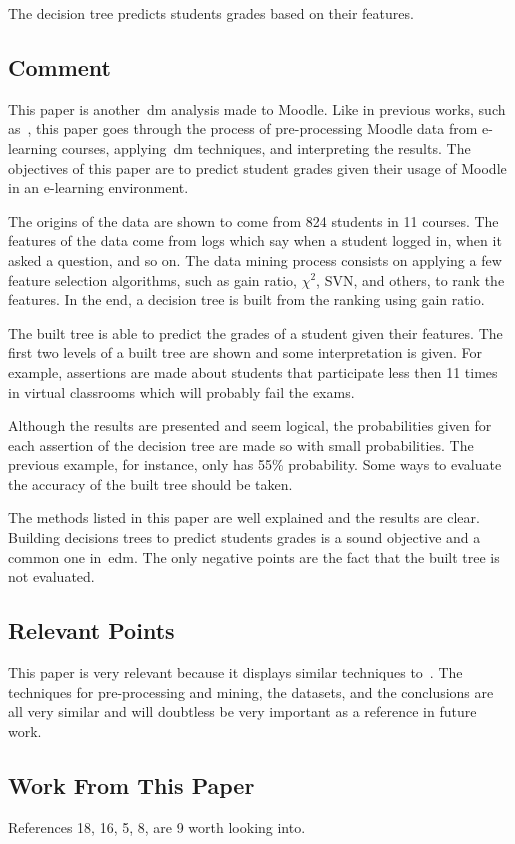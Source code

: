The decision tree predicts students grades based on their features.

\subsection{Comment}

This paper is another~\gls{dm} analysis made to Moodle. Like in previous works,
such as~\cite{ind_008, ind_003}, this paper goes through the process of
pre-processing Moodle data from e-learning courses, applying~\gls{dm}
techniques, and interpreting the results. The objectives of this paper are to
predict student grades given their usage of Moodle in an e-learning
environment.

The origins of the data are shown to come from 824 students in 11 courses. The
features of the data come from logs which say when a student logged in, when it
asked a question, and so on. The data mining process consists on applying a few
feature selection algorithms, such as gain ratio, $ \chi^2 $, SVN, and others,
to rank the features. In the end, a decision tree is built from the ranking
using gain ratio.

The built tree is able to predict the grades of a student given their features.
The first two levels of a built tree are shown and some interpretation is
given. For example, assertions are made about students that participate less
then 11 times in virtual classrooms which will probably fail the exams.

Although the results are presented and seem logical, the probabilities given
for each assertion of the decision tree are made so with small probabilities.
The previous example, for instance, only has 55\% probability. Some ways to
evaluate the accuracy of the built tree should be taken.

The methods listed in this paper are well explained and the results are clear.
Building decisions trees to predict students grades is a sound objective and a
common one in~\gls{edm}. The only negative points are the fact that the built
tree is not evaluated.

\subsection{Relevant Points}

This paper is very relevant because it displays similar techniques
to~\cite{ind_008, ind_003}. The techniques for pre-processing and mining, the
datasets, and the conclusions are all very similar and will doubtless be very
important as a reference in future work.

\subsection{Work From This Paper}

References 18, 16, 5, 8, are 9 worth looking into.

